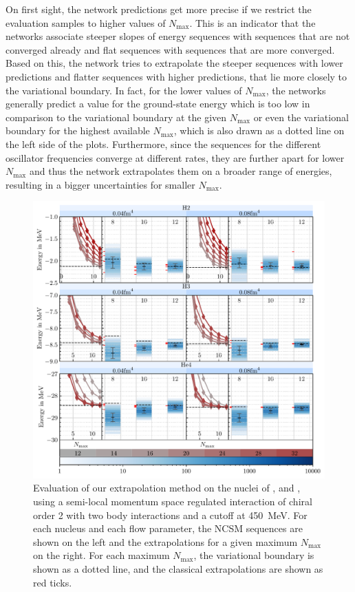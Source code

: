 On first sight, the network predictions get more precise if we restrict the evaluation samples to higher values of $N_\mathrm{max}$. This is an indicator that the networks associate steeper slopes of energy sequences with sequences that are not converged already and flat sequences with sequences that are more converged. Based on this, the network tries to extrapolate the steeper sequences with lower predictions and flatter sequences with higher predictions, that lie more closely to the variational boundary. In fact, for the lower values of $N_\mathrm{max}$, the networks generally predict a value for the ground-state energy which is too low in comparison to the variational boundary at the given $N_\mathrm{max}$ or even the variational boundary for the highest available $N_\mathrm{max}$, which is also drawn as a dotted line on the left side of the plots. Furthermore, since the sequences for the different oscillator frequencies converge at different rates, they are further apart for lower $N_\mathrm{max}$ and thus the network extrapolates them on a broader range of energies, resulting in a bigger uncertainties for smaller $N_\mathrm{max}$.
\begin{figure}[H]
  \centering
  \includegraphics[width=\textwidth]{media/vanilla_evaluation.pdf}
  \caption{Evaluation of our extrapolation method on the nuclei of ,  and , using a semi-local momentum space regulated interaction of chiral order 2 with two body interactions and a cutoff at \SI{450}{\mega\electronvolt}. For each nucleus and each flow parameter, the NCSM sequences are shown on the left and the extrapolations for a given maximum $N_\mathrm{max}$ on the right. For each maximum $N_\mathrm{max}$, the variational boundary is shown as a dotted line, and the classical extrapolations are shown as red ticks.}
  \label{fig:eval_vanilla}
\end{figure}
